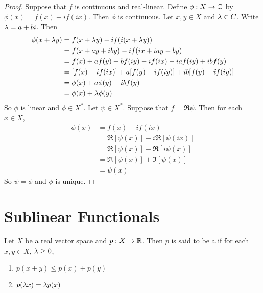\documentclass{book}
\begin{document}
	\begin{proof}
		Suppose that $f$ is continuous and real-linear. Define $\phi:X \rightarrow \mathbb{C}$ by $\phi(x) = f(x) -if(ix)$. Then $\phi$ is continuous. Let $x,y \in X$ and $\lambda \in C$. Write $\lambda = a + bi$. Then 
		\begin{align*}
			\phi(x + \lambda y)
			&= f(x + \lambda y) -if(i(x + \lambda y)) \\
			&= f(x + ay + i by) -if(ix + iay - by) \\
			&= f(x) + af(y) + bf(iy) - if(ix) - iaf(iy) +ibf(y) \\
			&= [f(x) - if(ix)] + a[f(y) - if(iy)] + ib[f(y) -if(iy)] \\
			&= \phi(x) + a\phi(y) +ibf(y) \\
			&= \phi(x) + \lambda \phi(y) 
		\end{align*}
	So $\phi$ is linear and $\phi \in X^*$. Let $\psi \in X^*$. Suppose that $f = \Re \psi$. 
	Then for each $x \in X$,
	\begin{align*}
		\phi(x) 
		&= f(x) - if(ix) \\
		&= \Re[ \psi(x)] -i \Re[ \psi(ix)] \\
		&= \Re [\psi(x)] - \Re [i\psi(x)] \\
		&= \Re [\psi(x)] + \Im[ \psi(x)] \\
		&= \psi(x)
	\end{align*} 
	So $\psi = \phi$ and $\phi$ is unique.
	\end{proof}


		





















	
	\newpage	
	\section{Sublinear Functionals}
	
	\begin{defn} 
		Let $X$ be a real vector space and $p:X \rightarrow \mathbb{R}$. Then $p$ is said to be a  if for each $x,y \in X$, $\lambda \geq 0$, 
		\begin{enumerate}
			\item $p(x+y) \leq p(x) + p(y)$
			\item $p(\lambda x ) = \lambda p(x)$
		\end{enumerate}  
	\end{defn}
	
\end{document}
